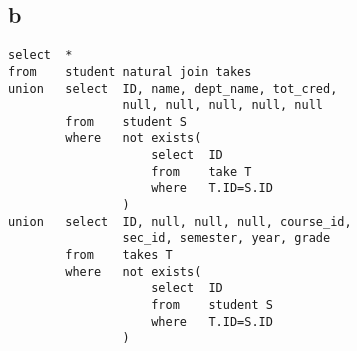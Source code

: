 \documentclass{article}
\begin{document}
    \subsection*{b}
    \begin{verbatim}
select  *
from    student natural join takes
union   select  ID, name, dept_name, tot_cred, 
                null, null, null, null, null
        from    student S
        where   not exists(
                    select  ID
                    from    take T
                    where   T.ID=S.ID
                )
union   select  ID, null, null, null, course_id,
                sec_id, semester, year, grade
        from    takes T
        where   not exists(
                    select  ID 
                    from    student S
                    where   T.ID=S.ID    
                )
    \end{verbatim}
\end{document}
